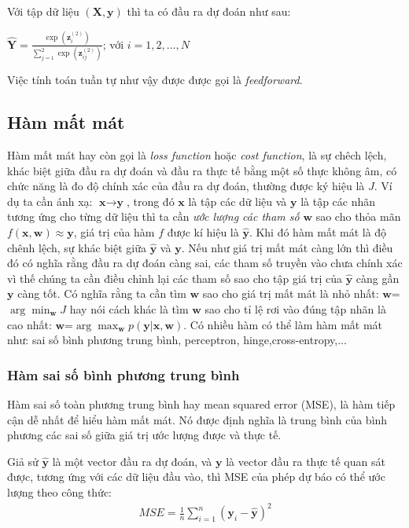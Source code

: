 Với tập dữ liệu $(\textbf{X},\textbf{y} )$ thì ta có đầu ra dự đoán như sau:  
\begin{center}

	$\widehat{\textbf{Y}} =\frac{\exp({\textbf{z}^{(2)}_i})}{\sum^{2}_{j=1}{\exp({\textbf{z}^{(2)}_{ij}})}}$; với $i=1,2,...,N$ 

\end{center}
Việc tính toán tuần tự như vậy được được gọi là \textit{feedforward}.
\subsection{Hàm mất mát}
  Hàm mất mát hay còn gọi là \textit{loss function} hoặc \textit{cost function}, là sự chêch lệch, khác biệt giữa đầu ra dự đoán và đầu ra thực tế bằng một số thực không âm, có chức năng là đo độ chính xác của đầu ra dự đoán, thường được ký hiệu là $J$. Ví dụ ta cần ánh xạ: $\textbf{x}\to \textbf{y}$,  trong đó $\textbf{x}$ là tập các dữ liệu và $\textbf{y}$ là tập các nhãn tương ứng cho từng dữ liệu thì ta cần \textit{ước lượng các tham số} $\textbf{w}$ sao cho thỏa mãn $ f(\textbf{x},\textbf{w}) \approx \textbf{y}$, giá trị của hàm $f$ được kí hiệu là $\widehat{\textbf{y}}$. Khi đó hàm mất mát là độ chênh lệch, sự khác biệt giữa \textbf{$\widehat{\textbf{y}}$} và $\textbf{y}$. Nếu như giá trị mất mát càng lớn thì điều đó có nghĩa rằng đầu ra dự đoán càng sai, các tham số truyền vào chưa chính xác vì thế chúng ta cần điều chỉnh lại các tham số sao cho tập giá trị của \textbf{$\widehat{\textbf{y}}$} càng gần $\textbf{y}$ càng tốt. Có nghĩa rằng ta cần tìm $\textbf{w}$ sao cho giá trị mất mát là nhỏ nhất: $\textbf{w}$=$\arg\min_{\textbf{w}} J $ hay nói cách khác là tìm $\textbf{w}$ sao cho tỉ lệ rơi vào đúng tập nhãn là cao nhất: $\textbf{w}$=$\arg\max_{\textbf{w}} p(\textbf{y}|\textbf{x},\textbf{w})$. Có nhiều hàm có thể làm hàm mất mát như: sai số bình phương trung bình, perceptron, hinge,cross-entropy,...
  
\subsubsection{Hàm sai số bình phương trung bình}
Hàm sai số toàn phương trung bình hay mean squared error (MSE), là hàm tiếp cận dễ nhất để hiểu hàm mất mát. Nó được định nghĩa là trung bình của bình phương các sai số giữa giá trị ước lượng được và thực tế.\par
Giả sử $\widehat{\textbf{y}}$ là một vector đầu ra dự đoán, và $\textbf{y}$ là vector đầu ra thực tế quan sát được, tương ứng với các dữ liệu đầu vào, thì MSE của phép dự báo có thể ước lượng theo công thức:
\begin{align*}
MSE = 
\frac{1}{n}
\sum_{i=1}^{n} (\textbf{y}_i - \widehat{\textbf{y}})^{2}
\end{align*}

